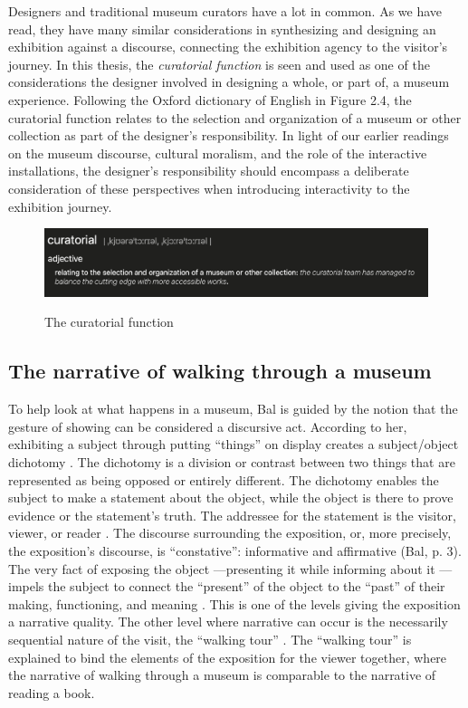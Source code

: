 Designers and traditional museum curators have a lot in common. As we have read, they have many similar considerations in synthesizing and designing an exhibition against a discourse, connecting the exhibition agency to the visitor's journey. In this thesis, the \emph{curatorial function} is seen and used as one of the considerations the designer involved in designing a whole, or part of, a museum experience. Following the Oxford dictionary of English in Figure 2.4, the curatorial function relates to the selection and organization of a museum or other collection as part of the designer's responsibility. In light of our earlier readings on the museum discourse, cultural moralism, and the role of the interactive installations, the designer's responsibility should encompass a deliberate consideration of these perspectives when introducing interactivity to the exhibition journey.

\begin{figure}[H]
\centering
\includegraphics[width=12.5cm]{pictures/background/curatorial.png}
\caption{The curatorial function}{\autocite{Oxford_dictionary}}
\end{figure}

\subsection{The narrative of walking through a museum}
To help look at what happens in a museum, Bal is guided by the notion that the gesture of showing can be considered a discursive act. According to her, exhibiting a subject through putting “things” on display creates a subject/object dichotomy \autocite[p. 3]{Miekebal_book}. The dichotomy is a division or contrast between two things that are represented as being opposed or entirely different. The dichotomy enables the subject to make a statement about the object, while the object is there to prove evidence or the statement's truth. The addressee for the statement is the visitor, viewer, or reader \autocite[p. 3]{Miekebal_book}. The discourse surrounding the exposition, or, more precisely, the exposition's discourse, is “constative”: informative and affirmative (Bal, p. 3). The very fact of exposing the object —presenting it while informing about it — impels the subject to connect the “present” of the object to the “past” of their making, functioning, and meaning \autocite[p. 4]{Miekebal_book}. This is one of the levels giving the exposition a narrative quality. The other level where narrative can occur is the necessarily sequential nature of the visit, the “walking tour” \autocite[p. 4]{Miekebal_book}. The “walking tour” is explained to bind the elements of the exposition for the viewer together, where the narrative of walking through a museum is comparable to the narrative of reading a book.

